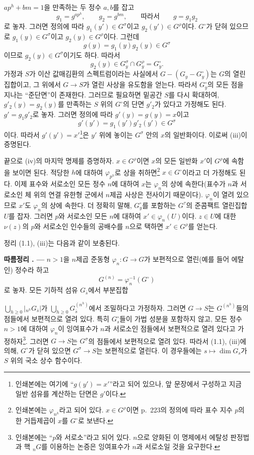 \documentclass[11pt,twoside,openany]{book}
\numberwithin{equation}{section}
\newcommand{\sourceunit}{front}
\newcommand{\src}[1]{%
  \phantomsection\hypertarget{src:\sourceunit:#1}{}%
  \marginpar{\raggedleft\footnotesize\sffamily #1}%
}
\theoremstyle{plain}
\theoremstyle{definition}
\theoremstyle{remark}
\newcommand{\result}[2]{%
  \par\medskip\noindent\textbf{#1%
  \if\relax\detokenize{#2}\relax\else\space#2\fi. ---}\enspace
}
\begin{document}
\src{227}
$ap^h+bm=1$을 만족하는 두 정수 $a,b$를 잡고
\[
g_1=g^{ap^h},\qquad g_2=g^{bm},\qquad\text{따라서}\qquad g=g_1g_2
\]
로 놓자. 그러면 정의에 따라 $g_1(y')\in G^\sigma$이고
$g_2(y')\in G^\rho$이다. $G^\circ$가 닫혀 있으므로
$g_1(y)\in G^\sigma$이고 $g_2(y)\in G^\rho$이다. 그런데
\[
g(y)=g_1(y)g_2(y)\in G^\sigma
\]
이므로 $g_2(y)\in G^\sigma$이기도 하다. 따라서
\[
g_2(y)\in G_y^\sigma\cap G_y^\rho=G_y^\circ.
\]
가정과 $S$가 이산 값매김환의 스펙트럼이라는 사실에서
$G-(G_y-G_y^\circ)$는 $G$의 열린집합이고, 그 위에서
$G\longrightarrow S$가 열린 사상을 유도함을 얻는다. 따라서
$G_y^\circ$의 모든 점을 지나는 ``준단면''이 존재한다. 그러므로 필요하면
밑공간 $S$를 다시 확대하여, $g'_2(y)=g_2(y)$를 만족하는 $S$ 위의
$G^\circ$의 단면 $g'_2$가 있다고 가정해도 된다. $g'=g_1g'_2$로 놓자.
그러면 정의에 따라 $g'(y)=g(y)=x$이고
\[
g'(y')=g_1(y')g'_2(y')\in G^\sigma
\]
이다. 따라서 $g'(y')=x'$\footnote{인쇄본에는 여기에 ``$g(y')=x'$''라고
되어 있으나, 앞 문장에서 구성하고 지금 일반 섬유를 계산하는 단면은
$g'$이다.}은 $y'$ 위에 놓이는 $G^\sigma$ 안의 $x$의 일반화이다. 이로써
(iii)이 증명된다.

끝으로 (iv)의 마지막 명제를 증명하자. $x\in G^\rho$이면 $x$의 모든
일반화 $x'$이 $G^\rho$에 속함을 보이면 된다. 적당한 $h$에 대하여
$\varphi_{p^h}$로 상을 취하면\footnote{인쇄본에는 $\varphi_{n^h}$라고
되어 있다. $x\in G^\rho$이면 p.~223의 정의에 따라 표수 지수 $p$의 한
거듭제곱이 $x$를 $G^\circ$로 보낸다.} $x\in G^\circ$이라고 더 가정해도
된다. 이제 표수와 서로소인 모든 정수 $n$에 대하여 $x$는
$\varphi_n$의 상에 속한다(표수가 $n$과 서로소인 체 위의 연결 유한형
군에서 $n$제곱 사상은 전사이기 때문이다). $\varphi_n$이 열려 있으므로
$x'$도 $\varphi_n$의 상에 속한다. 더 정확히 말해, $G_y^\circ$를 포함하는
$G^\tau$의 준콤팩트 열린집합 $U$를 잡자. 그러면 $p$와 서로소인 모든
$n$에 대하여 $x'\in\varphi_n(U)$이다. $z\in U$에 대한 $\nu(z)$의
$p$와 서로소인 인수들의 공배수를 $n$으로 택하면 $x'\in G^\rho$를
얻는다.

정리 (1.1), (iii)는 다음과 같이 보충된다.

\result{따름정리}{1.5} $n>1$을 $n$제곱 준동형
$\varphi_n:G\longrightarrow G$가 보편적으로 열린(예를 들어 에탈인)
정수라 하고
\[
G^{(n)}=\varphi_n^{-1}(G^\circ)
\]
로 놓자. 모든 기하적 섬유 $G_{\bar s}$에서 부분집합

\src{228}
$\bigcup_{h\geq0}|{}_{n^h}G_{\bar s}|$가
$\bigcup_{h\geq0}G_{\bar s}^{(n^h)}$에서 조밀하다고 가정하자. 그러면
$G\longrightarrow S$는 $G^{(n^h)}$들의 점들에서 보편적으로 열려 있다.
특히 $G_s^\circ$들이 가법 성분을 포함하지 않고, 모든 정수 $n>1$에
대하여 $\varphi_n$이 잉여표수가 $n$과 서로소인 점들에서 보편적으로
열려 있다고 가정하자\footnote{인쇄본에는 ``$p$와 서로소''라고 되어 있다.
$n$으로 양화된 이 명제에서 에탈성 판정법과 핵 ${}_nG$를 이용하는 논증은
잉여표수가 $n$과 서로소일 것을 요구한다.}. 그러면
$G\longrightarrow S$는 $G^\sigma$의 점들에서 보편적으로 열려 있다.
따라서 (1.1), (iii)에 의해, $G^\circ$가 닫혀 있으면
$G^\sigma\longrightarrow S$는 보편적으로 열린다. 이 경우들에는
$s\longmapsto\dim G_s$가 $S$ 위의 국소 상수 함수이다.
\end{document}
